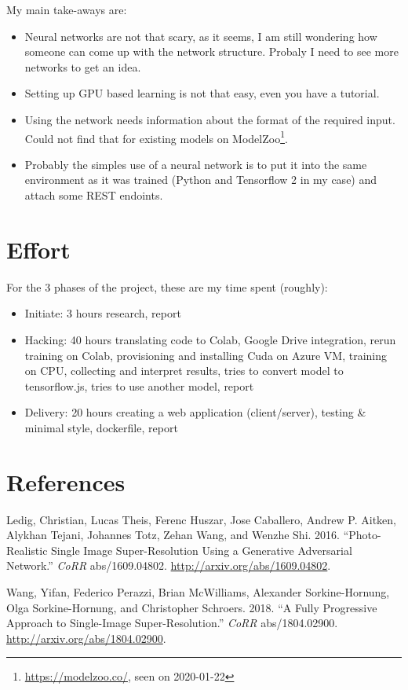 \documentclass[]{article}
\providecommand{\tightlist}{%
  \setlength{\itemsep}{0pt}\setlength{\parskip}{0pt}}
\let\rmarkdownfootnote\footnote%
\def\footnote{\protect\rmarkdownfootnote}
\begin{document}
My main take-aways are:

\begin{itemize}
\item
  Neural networks are not that scary, as it seems, I am still wondering
  how someone can come up with the network structure. Probaly I need to
  see more networks to get an idea.
\item
  Setting up GPU based learning is not that easy, even you have a
  tutorial.
\item
  Using the network needs information about the format of the required
  input. Could not find that for existing models on
  ModelZoo\footnote{\url{https://modelzoo.co/}, seen on 2020-01-22}.
\item
  Probably the simples use of a neural network is to put it into the
  same environment as it was trained (Python and Tensorflow 2 in my
  case) and attach some REST endoints.
\end{itemize}

\hypertarget{effort}{%
\section{Effort}\label{effort}}

For the 3 phases of the project, these are my time spent (roughly):

\begin{itemize}
\tightlist
\item
  Initiate: 3 hours research, report
\item
  Hacking: 40 hours translating code to Colab, Google Drive integration,
  rerun training on Colab, provisioning and installing Cuda on Azure VM,
  training on CPU, collecting and interpret results, tries to convert
  model to tensorflow.js, tries to use another model, report
\item
  Delivery: 20 hours creating a web application (client/server), testing
  \& minimal style, dockerfile, report
\end{itemize}

\hypertarget{references}{%
\section*{References}\label{references}}

\hypertarget{refs}{}
\leavevmode\hypertarget{ref-DBLP:journalsux2fcorrux2fLedigTHCATTWS16}{}%
Ledig, Christian, Lucas Theis, Ferenc Huszar, Jose Caballero, Andrew P.
Aitken, Alykhan Tejani, Johannes Totz, Zehan Wang, and Wenzhe Shi. 2016.
``Photo-Realistic Single Image Super-Resolution Using a Generative
Adversarial Network.'' \emph{CoRR} abs/1609.04802.
\url{http://arxiv.org/abs/1609.04802}.

\leavevmode\hypertarget{ref-DBLP:journalsux2fcorrux2fabs-1804-02900}{}%
Wang, Yifan, Federico Perazzi, Brian McWilliams, Alexander
Sorkine-Hornung, Olga Sorkine-Hornung, and Christopher Schroers. 2018.
``A Fully Progressive Approach to Single-Image Super-Resolution.''
\emph{CoRR} abs/1804.02900. \url{http://arxiv.org/abs/1804.02900}.
\end{document}
